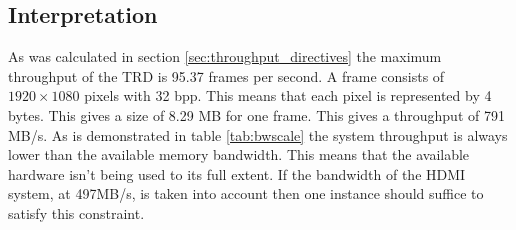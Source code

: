 \subsection{Interpretation}
As was calculated in section \ref{sec:throughput_directives} the maximum throughput of the TRD is 95.37 frames per second. A frame consists of  $1920\times1080$ pixels  with 32 bpp. This means that each pixel is represented by 4 bytes. This gives a size of 8.29 MB for one frame. This gives a throughput of 791 MB/s. As is demonstrated in table \ref{tab:bwscale} the system throughput is always lower than the available memory bandwidth. This means that the available hardware isn't being used to its full extent. If the bandwidth of the HDMI system, at 497MB/s, is taken into account then one instance should suffice to satisfy this constraint. 



